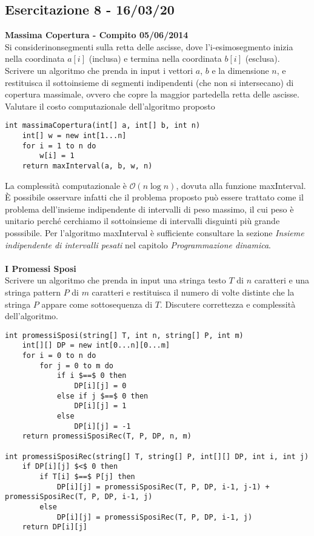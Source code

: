 \documentclass[../cheatSheetAlgoritmi.tex]{subfiles}
\begin{document}
\subsection{Esercitazione 8 - 16/03/20}
\textbf{Massima Copertura - Compito 05/06/2014}\\
Si considerinonsegmenti sulla retta delle ascisse, dove l'i-esimosegmento inizia nella coordinata $a[i]$ (inclusa) e termina nella coordinata $b[i]$ (esclusa). Scrivere un algoritmo che prenda in input i vettori $a$, $b$ e la dimensione $n$, e restituisca il sottoinsieme di segmenti indipendenti (che non si intersecano) di copertura massimale, ovvero che copre la maggior partedella retta delle ascisse. Valutare il costo computazionale dell'algoritmo proposto
\begin{lstlisting}[caption=Massima copertura]
int massimaCopertura(int[] a, int[] b, int n)
    int[] w = new int[1...n]
    for i = 1 to n do
        w[i] = 1
    return maxInterval(a, b, w, n)
\end{lstlisting}
La complessità computazionale è $\mathcal{O}(n \log n)$, dovuta alla funzione maxInterval. \\
È possibile osservare infatti che il problema proposto può essere trattato come il problema dell'insieme indipendente di intervalli di peso massimo, il cui peso è unitario perché cerchiamo il sottoinsieme di intervalli disguinti più grande posssibile. Per l'algoritmo maxInterval è sufficiente consultare la sezione \emph{Insieme indipendente di intervalli pesati} nel capitolo \emph{Programmazione dinamica}.\\\\
\textbf{I Promessi Sposi}\\
Scrivere un algoritmo che prenda in input una stringa testo $T$ di $n$ caratteri e una stringa pattern $P$ di $m$ caratteri e restituisca il numero di volte distinte che la stringa $P$ appare come sottosequenza di $T$. Discutere correttezza e complessità dell’algoritmo.
\begin{lstlisting}[caption=Sottosequenze di un pattern in un testo (Promessi Sposi)]
int promessiSposi(string[] T, int n, string[] P, int m)
	int[][] DP = new int[0...n][0...m]
	for i = 0 to n do
		for j = 0 to m do
			if i $==$ 0 then
				DP[i][j] = 0
			else if j $==$ 0 then
				DP[i][j] = 1
			else 
				DP[i][j] = -1
	return promessiSposiRec(T, P, DP, n, m)
	
int promessiSposiRec(string[] T, string[] P, int[][] DP, int i, int j)
	if DP[i][j] $<$ 0 then
		if T[i] $==$ P[j] then
			DP[i][j] = promessiSposiRec(T, P, DP, i-1, j-1) + promessiSposiRec(T, P, DP, i-1, j)
		else
			DP[i][j] = promessiSposiRec(T, P, DP, i-1, j)
	return DP[i][j]
\end{lstlisting}
\end{document}
